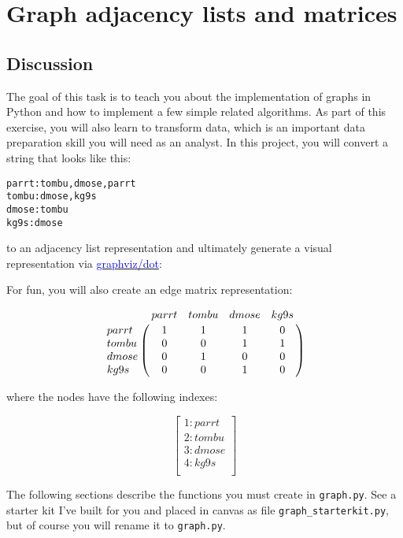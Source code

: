 \chapter{Graph adjacency lists and matrices}

\setcounter{problem}{1}
\section{Discussion}

\begin{fullwidth}

The goal of this task is to teach you about the implementation of graphs in Python and how to implement a few simple related algorithms.  As part of this exercise, you will also learn to transform data, which is an important data preparation skill you will need as an analyst.   In this project, you will convert a string that looks like this:

\begin{alltt}\small
parrt: tombu, dmose, parrt
tombu: dmose, kg9s
dmose: tombu
kg9s: dmose
\end{alltt}

\noindent to an adjacency list representation and ultimately generate a visual representation via \href{http://www.graphviz.org/}{\textcolor{blue}{graphviz/dot}}:

\begin{center}
\end{center}

\noindent For fun, you will also create an edge matrix representation:

\[
\bordermatrix{
~ & parrt & tombu & dmose & kg9s \cr
parrt & 1 & 1 & 1 & 0\cr
tombu & 0 & 0 & 1 & 1 \cr
dmose & 0 & 1 & 0 & 0 \cr
kg9s & 0 & 0 & 1 & 0\cr
}
\]

\noindent where the nodes have the following indexes:
 
 \[
\left[
\begin{array}{c}
1: parrt \\
2: tombu \\
3: dmose \\
4: kg9s \\
\end{array}
\right]
\]

The following sections describe the functions you must create in {\tt graph.py}. See a starter kit I've built for you and placed in canvas as file {\tt graph\_starterkit.py}, but of course you will rename it to {\tt graph.py}.


\end{fullwidth}
